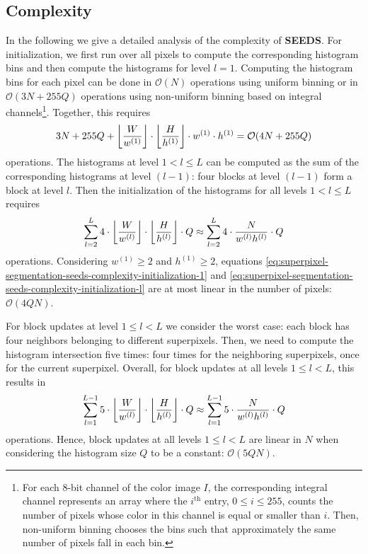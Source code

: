 \subsection{Complexity}
\label{subsection:superpixel-segmentation-seeds-complexity}

In the following we give a detailed analysis of the complexity of \textbf{SEEDS}. For initialization, we first run over all pixels to compute the corresponding histogram bins and then compute the histograms for level $l = 1$. Computing the histogram bins for each pixel can be done in $\mathcal{O}(N)$ operations using uniform binning or in $\mathcal{O}(3N + 255Q)$ operations using non-uniform binning based on integral channels\footnote{For each $8$-bit channel of the color image $I$, the corresponding integral channel represents an array where the $i^{\text{th}}$ entry, $0 \leq i \leq 255$, counts the number of pixels whose color in this channel is equal or smaller than $i$. Then, non-uniform binning chooses the bins such that approximately the same number of pixels fall in each bin.}. Together, this requires
\begin{align}
	\label{eq:superpixel-segmentation-seeds-complexity-initialization-1}
	3N + 255Q + \floor*{\frac{W}{w^{(1)}}} \cdot \floor*{\frac{H}{h^{(1)}}} \cdot w^{(1)} \cdot h^{(1)} = \mathcal{O}(4N + 255Q)
\end{align}
operations. The histograms at level $1 < l \leq L$ can be computed as the sum of the corresponding histograms at level $(l - 1)$: four blocks at level $(l - 1)$ form a block at level $l$. Then the initialization of the histograms for all levels $1 < l \leq L$ requires
\begin{align}
	\label{eq:superpixel-segmentation-seeds-complexity-initialization-l}
	\sum_{l = 2}^L 4\cdot \floor*{\frac{W}{w^{(l)}}} \cdot \floor*{\frac{H}{h^{(l)}}} \cdot Q \approx \sum_{l = 2}^L 4 \cdot \frac{N}{w^{(l)} h^{(l)}} \cdot Q
\end{align}
operations. Considering $w^{(1)} \geq 2$ and $h^{(1)} \geq 2$, equations \eqref{eq:superpixel-segmentation-seeds-complexity-initialization-1} and \eqref{eq:superpixel-segmentation-seeds-complexity-initialization-l} are at most linear in the number of pixels: $\mathcal{O}(4QN)$.

For block updates at level $1 \leq l < L$ we consider the worst case: each block has four neighbors belonging to different superpixels. Then, we need to compute the histogram intersection five times: four times for the neighboring superpixels, once for the current superpixel. Overall, for block updates at all levels $1 \leq l < L$, this results in
\begin{align}
	\label{eq:superpixel-segmentation-seeds-complexity-block-updates}
	\sum_{l = 1}^{L - 1} 5 \cdot \floor*{\frac{W}{w^{(l)}}} \cdot \floor*{\frac{H}{h^{(l)}}} \cdot Q \approx \sum_{l = 1}^{L - 1} 5 \cdot \frac{N}{w^{(l)}h^{(l)}} \cdot Q
\end{align}
operations. Hence, block updates at all levels $1 \leq l < L$ are linear in $N$ when considering the histogram size $Q$ to be a constant: $\mathcal{O}(5QN)$.

